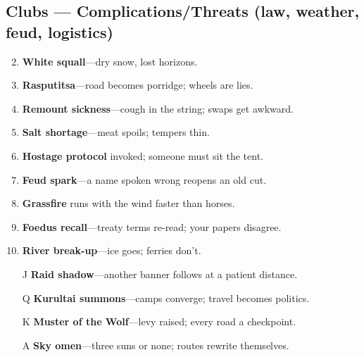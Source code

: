 \subsection*{Clubs --- Complications/Threats (law, weather, feud, logistics)}
\begin{enumerate}
\setcounter{enumi}{1}
\item \textbf{White squall}---dry snow, lost horizons.
\item \textbf{Rasputitsa}---road becomes porridge; wheels are lies.
\item \textbf{Remount sickness}---cough in the string; swaps get awkward.
\item \textbf{Salt shortage}---meat spoils; tempers thin.
\item \textbf{Hostage protocol} invoked; someone must sit the tent.
\item \textbf{Feud spark}---a name spoken wrong reopens an old cut.
\item \textbf{Grassfire} runs with the wind faster than horses.
\item \textbf{Foedus recall}---treaty terms re-read; your papers disagree.
\item \textbf{River break-up}---ice goes; ferries don't.
\item[J] \textbf{Raid shadow}---another banner follows at a patient distance.
\item[Q] \textbf{Kurultai summons}---camps converge; travel becomes politics.
\item[K] \textbf{Muster of the Wolf}---levy raised; every road a checkpoint.
\item[A] \textbf{Sky omen}---three suns or none; routes rewrite themselves.
\end{enumerate}

